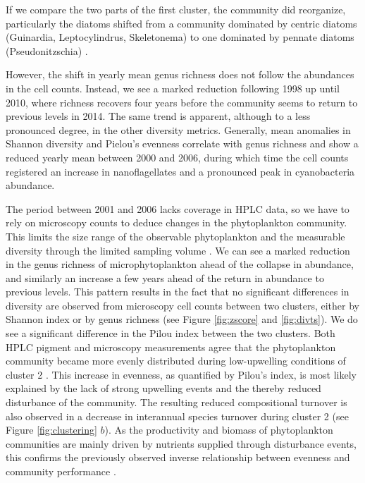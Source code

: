 \documentclass[draft]{agujournal2019}
\begin{document}
If we compare the two parts of the first cluster, the community did reorganize, particularly the diatoms shifted from a community dominated by centric diatoms (Guinardia, Leptocylindrus, Skeletonema) to one dominated by pennate diatoms (Pseudonitzschia) \cite{pinckney_phytoplankton_2015}.

However, the shift in yearly mean genus richness does not follow the abundances in the cell counts. Instead, we see a marked reduction following 1998 up until 2010, where richness recovers four years before the community seems to return to previous levels in 2014. The same trend is apparent, although to a less pronounced degree, in the other diversity metrics. Generally, mean anomalies in Shannon diversity and Pielou's evenness correlate with genus richness and show a reduced yearly mean between 2000 and 2006, during which time the cell counts registered an increase in nanoflagellates and a pronounced peak in cyanobacteria abundance. 

The period between 2001 and 2006 lacks coverage in HPLC data, so we have to rely on microscopy counts to deduce changes in the phytoplankton community. This limits the size range of the observable phytoplankton and the measurable diversity through the limited sampling volume \cite{cermeno_sampling_2014}. We can see a marked reduction in the genus richness of microphytoplankton ahead of the collapse in abundance, and similarly an increase a few years ahead of the return in abundance to previous levels. 
This pattern results in the fact that no significant differences in diversity are observed from microscopy cell counts between two clusters, either by Shannon index or by genus richness (see Figure \ref{fig:zscore} and \ref{fig:divts}).
We do see a significant difference in the Pilou index between the two clusters. Both HPLC pigment and microscopy measurements agree that the phytoplankton community became more evenly distributed during low-upwelling conditions of cluster 2 \cite{pinckney_phytoplankton_2015}. This increase in evenness, as quantified by Pilou's index, is most likely explained by the lack of strong upwelling events and the thereby reduced disturbance of the community. The resulting reduced compositional turnover is also observed in a decrease in interannual species turnover during cluster 2 (see Figure \ref{fig:clustering} $b$). As the productivity and biomass of phytoplankton communities are mainly driven by nutrients supplied through disturbance events, this confirms the previously observed inverse relationship between evenness and community performance \cite{lehtinen_phytoplankton_2017, otero_phytoplankton_2020}.
\end{document}
